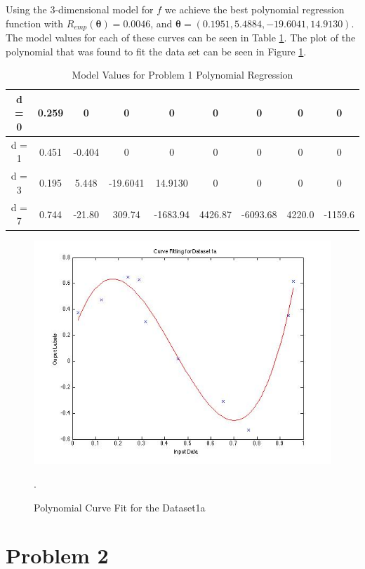 \documentclass[paper=a4, fontsize=11pt]{scrartcl} %
\begin{document}
Using the 3-dimensional model for $f$ we achieve the best polynomial regression function with  $R_{emp}(\bm{\theta}) = 0.0046$, and $\bm{\theta} = (0.1951, 5.4884, -19.6041, 14.9130)$.
The model values for each of these curves can be seen in Table \ref{tab:prob1_models}.
The plot of the polynomial that was found to fit the data set can be seen in Figure \ref{fig:prob1_curve1}.

\begin{table}
\label{tab:prob1_models}
\caption{Model Values for Problem 1 Polynomial Regression}
\begin{tabular}{|c|c|c|c|c|c|c|c|c|}
\hline
d = 0& 0.259&0 &0 &0 &0 &0 &0 & 0\\ \hline
d = 1 & 0.451 & -0.404&0 &0 &0 &0 &0 & 0\\ \hline
d = 3 & 0.195 &5.448&-19.6041 &14.9130&0 &0 &0 & 0\\ \hline
d = 7 & 0.744&-21.80 &309.74&-1683.94&4426.87 &-6093.68&4220.0 &-1159.6 \\
\hline
\end{tabular}
\end{table}

\begin{figure}
\centering
\includegraphics[scale=0.4]{Curve.jpg}
\caption{Polynomial Curve Fit for the Dataset1a}
\label{fig:prob1_curve1}.
\end{figure}

\section{Problem 2}
\end{document}
